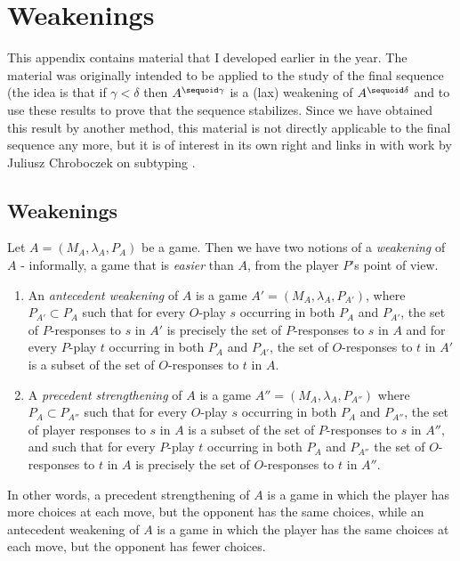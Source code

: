 \documentclass[11pt]{article} %
\begin{document}
\section{Weakenings}

This appendix contains material that I developed earlier in the year.  The material was originally intended to be applied to the study of the final sequence (the idea is that if $\gamma<\delta$ then $A^{\sequoid\gamma}$ is a (lax) weakening of $A^{\sequoid\delta}$ and to use these results to prove that the sequence stabilizes.  Since we have obtained this result by another method, this material is not directly applicable to the final sequence any more, but it is of interest in its own right and links in with work by Juliusz Chroboczek on subtyping \cite{juliuszthesis}.  

\subsection{Weakenings}

Let $A=(M_A,\lambda_A,P_A)$ be a game.  Then we have two notions of a \emph{weakening} of $A$ - informally, a game that is \emph{easier} than $A$, from the player $P$'s point of view.  

\begin{enumerate}
  \item An \emph{antecedent weakening} of $A$ is a game $A'=(M_A,\lambda_A,P_{A'})$, where $P_{A'}\subset P_{A}$ such that for every $O$-play $s$ occurring in both $P_A$ and $P_{A'}$, the set of $P$-responses to $s$ in $A'$ is precisely the set of $P$-responses to $s$ in $A$ and for every $P$-play $t$ occurring in both $P_A$ and $P_{A'}$, the set of $O$-responses to $t$ in $A'$ is a subset of the set of $O$-responses to $t$ in $A$.  
  \item A \emph{precedent strengthening} of $A$ is a game $A''=(M_A,\lambda_A,P_{A''})$ where $P_A\subset P_{A''}$ such that for every $O$-play $s$ occurring in both $P_A$ and $P_{A''}$, the set of player responses to $s$ in $A$ is a subset of the set of $P$-responses to $s$ in $A''$, and such that for every $P$-play $t$ occurring in both $P_A$ and $P_{A''}$ the set of $O$-responses to $t$ in $A$ is precisely the set of $O$-responses to $t$ in $A''$.  
\end{enumerate}

In other words, a precedent strengthening of $A$ is a game in which the player has more choices at each move, but the opponent has the same choices, while an antecedent weakening of $A$ is a game in which the player has the same choices at each move, but the opponent has fewer choices.  
\end{document}
